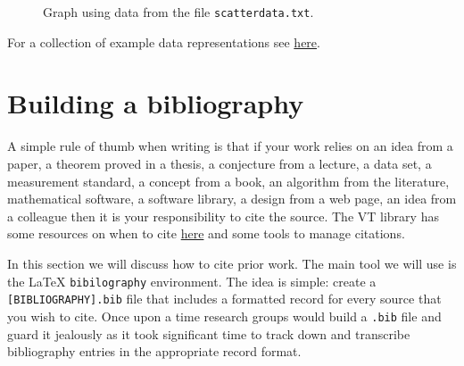 \begin{figure}[htbp!]
    \centering
    \caption{Graph using data from the file \texttt{scatterdata.txt}.}
    \label{fig:pic_from_file}
\end{figure}

For a collection of example data representations see \href{http://pgfplots.sourceforge.net/gallery.html}{here}.

\section{Building a bibliography}

A simple rule of thumb when writing is that if your work relies on an idea from a paper, a theorem proved in a thesis, a conjecture from a lecture, a data set, a measurement standard, a concept from a book, an algorithm from the literature, mathematical software, a software library, a design from a web page, an idea from a colleague then it is your responsibility to cite the source. The VT library has some resources on when to cite \href{https://guides.lib.vt.edu/citationmanagers}{here} and some tools to manage citations.

In this section we will discuss how to cite prior work. The main tool we will use is the \LaTeX{}  \texttt{bibilography} environment. The idea is simple: create a \texttt{[BIBLIOGRAPHY].bib} file that includes a formatted record for every source that you wish to cite. Once upon a time research groups would build a \texttt{.bib} file and guard it jealously as it took significant time to track down and transcribe bibliography entries in the appropriate record format. 

